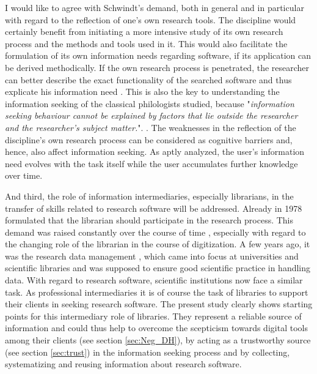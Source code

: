 \documentclass[12pt, a4paper, titlepage, oneside, abstract=true, toc=listof, toc=bibliography, BCOR=1cm]{scrreprt}
\begin{document}
{I would like to agree with Schwindt's demand, both in general and in particular with regard to the reflection of one's own research tools. The discipline would certainly benefit from initiating a more intensive study of its own research process and the methods and tools used in it. This would also facilitate the formulation of its own information needs regarding software, if its application can be derived methodically. If the own research process is penetrated, the researcher can better describe the exact functionality of the searched software and thus explicate his information need \citep{Cole2011}. This is also the key to understanding the information seeking of the classical philologists studied, because "\textit{information seeking behaviour cannot be explained by factors that lie outside the researcher and the researcher's subject matter.}". \citep[p. 200]{Loennqvist2007}. The weaknesses in the reflection of the discipline's own research process can be considered as cognitive barriers \citep{Savolainen2015a} and, hence, also affect information seeking. As \citet{Schamber1990} aptly analyzed, the user's information need evolves with the task itself while the user accumulates further knowledge over time.

And third, the role of information intermediaries, especially librarians, in the transfer of skills related to research software will be addressed. Already in 1978 \citet{Gunning1978} formulated that the librarian should participate in the research process. This demand was raised constantly over the course of time \citep{Buddenbohm2017, Case2008, Cunningham2010, Koltay2016, MonroeGulick2013, Rothfritz2018, Warwick2008}, especially with regard to the changing role of the librarian in the course of digitization. A few years ago, it was the research data management \citep{Coates2014}, which came into focus at universities and scientific libraries and was supposed to ensure good scientific practice in handling data. With regard to research software, scientific institutions now face a similar task. As professional intermediaries \citep{Edmond2005} it is of course the task of libraries to support their clients in seeking research software. The present study clearly shows starting points for this intermediary role of libraries. They represent a reliable source of information and could thus help to overcome the scepticism towards digital tools among their clients (see section \ref{sec:Neg_DH}), by acting as a trustworthy source (see section \ref{sec:trust}) in the information seeking process and by collecting, systematizing and reusing information about research software.

}
\end{document}
